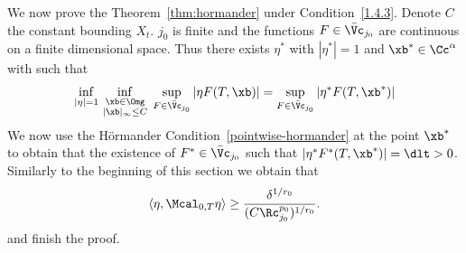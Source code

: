 We now prove the Theorem~\ref{thm:hormander} under Condition~\eqref{1.4.3}. Denote $C$ the constant bounding $X_t$. $j_0$ is finite and the functions $F\in \bar \Vc_{j_0}$ are continuous\pagebreak{} on a finite dimensional space. Thus there exists $\eta^*$ with $|\eta^*|=1$ and $\xb^*\in \Cc^\alpha$ with such that
\[
\inf_{|\eta|=1}\,\inf_{\substack{\xb\in \Omg\\|\xb|_\infty \leq C}}\;\sup_{F\in \bar \Vc_{j_0}} |\eta F(T,\xb)| = \sup_{F\in \bar \Vc_{j_0}} |\eta^* F(T,\xb^*)|
\]
We now use the H\"ormander Condition~\eqref{pointwise-hormander} at the point $\xb^*$ to obtain that the existence of $F^*\in \bar \Vc_{j_0}$ such that $ |\eta^* F^*(T,\xb^*)| =\dlt>0$. Similarly to the beginning of this section we obtain that
\[
\langle \eta, \Mcal_{0,T} \eta \rangle\geq\frac{\delta ^{1/r_0}}{(C\Rc_{j_0}^{p_0})^{1/r_0}}.
\]
and finish the proof.

